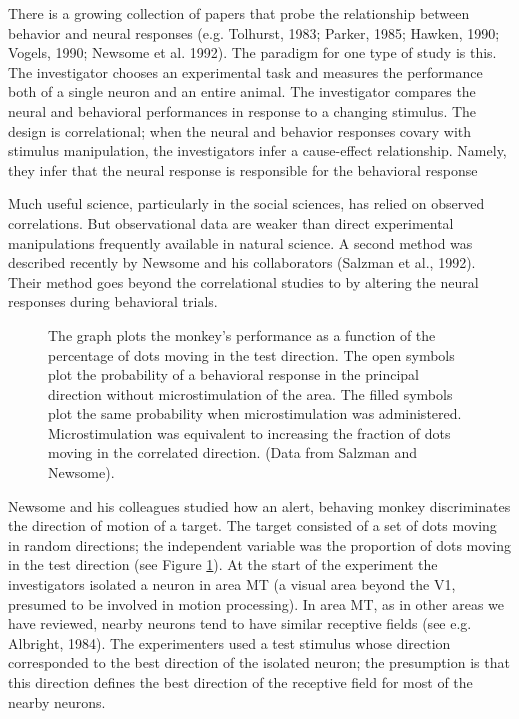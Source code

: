 There is a growing collection of papers that
probe the relationship between behavior and neural
responses (e.g. Tolhurst, 1983; Parker, 1985; Hawken, 1990; Vogels,
1990; Newsome et al. 1992).
The paradigm for one type of study is this.
The investigator chooses an experimental task
and measures the performance both
of a single neuron and an entire animal.
The investigator compares the neural and behavioral performances
in response to a changing stimulus.
The design is correlational;
when the neural and behavior responses covary with
stimulus manipulation, the investigators infer
a cause-effect relationship.
Namely, they infer that the neural response is
responsible for the behavioral response

Much useful science, particularly in the social sciences,
has relied on observed correlations.
But observational data are weaker than direct experimental
manipulations frequently available in natural science.
A second method was described recently by Newsome
and his collaborators (Salzman et al., 1992).
Their method goes beyond the correlational
studies to by altering the neural responses during
behavioral trials.

\begin{figure}
\centerline{
}
\caption[Microstimulation Experiments]{
The graph plots the monkey's performance
as a function of the percentage of dots
moving in the test direction.
The open symbols plot the probability of a behavioral
response in the principal direction without microstimulation
of the area.
The filled symbols plot the same probability
when microstimulation was administered.
Microstimulation was equivalent to increasing the
fraction of dots moving in the correlated direction.
(Data from Salzman and Newsome).
}
\label{f5:newsome}
\end{figure}
Newsome and his colleagues studied how
an alert, behaving monkey discriminates
the direction of motion of a target.
The target consisted of a set of dots moving in random directions;
the independent variable was the proportion of dots 
moving in the test direction (see Figure \ref{f5:newsome}).
At the start of the experiment
the investigators isolated a neuron in area MT
(a visual area beyond the V1, presumed to be
involved in motion processing).
In area MT, as in other areas we have reviewed, nearby
neurons tend to have similar receptive fields (see e.g. Albright, 1984).
The experimenters used a test stimulus whose direction
corresponded to the best direction
of the isolated neuron;
the presumption is that this direction
defines the best direction of the receptive
field for most of the nearby neurons.


